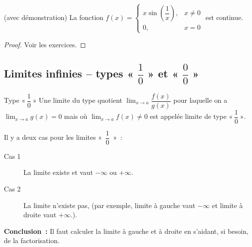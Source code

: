 \documentclass[a4paper,12pt]{article}
\begin{document}
\begin{coro}
(avec démonstration)
	\tcblower 
	La fonction $f(x)=\begin{cases}x\sin\left(\dfrac{1}{x}\right),& x\neq 0\\
	0, &x=0\end{cases}$ est continue.

	\begin{proof}
Voir les exercices. 
	\end{proof}
	
\end{coro}
\subsection{Limites infinies -- types « $\dfrac{1}{0}$ » et « $\dfrac{0}{0}$ »}
\begin{definition}
	Type $«~\dfrac{1}{0}~»$
	\tcblower
	Une limite du type quotient \(\displaystyle \lim_{x\to a}\dfrac{f(x)}{g(x)}\) pour laquelle on a \(\displaystyle \lim_{x\to a}g(x)=0\) mais où \(\displaystyle \lim_{x\to a}f(x)\neq0\) est appelée limite de type \(«~\displaystyle \dfrac{1}{0}~»\). 
\end{definition}
\begin{remarque}
	\tcblower
	Il y a deux cas pour les limites «~$\dfrac{1}{0}$~»~:
	\begin{description}
		\item[Cas 1] La limite existe et vaut $-\infty$ ou $+\infty$.
		\item[Cas 2] La limite n'existe pas, (par exemple, limite à gauche vaut $-\infty$ et limite à droite vaut $+\infty$.).
	\end{description}
	{\bfseries Conclusion~:} Il faut calculer la limite à gauche et à droite en s'aidant, si besoin, de la factorisation.
\end{remarque}
\end{document}

